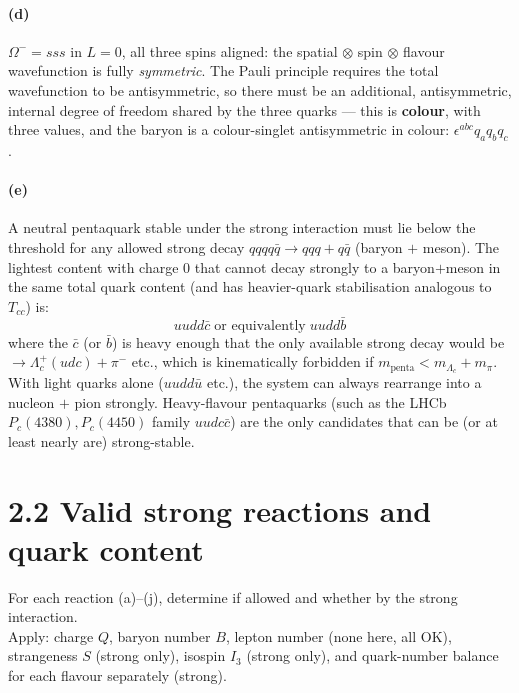 \documentclass[11pt]{article}
\newcommand{\Q}[1]{\begin{question}#1\end{question}}
\begin{document}
\paragraph{(d)} $\Omega^-=sss$ in $L=0$, all three spins aligned: the spatial $\otimes$ spin $\otimes$ flavour wavefunction is fully \emph{symmetric}. The Pauli principle requires the total wavefunction to be antisymmetric, so there must be an additional, antisymmetric, internal degree of freedom shared by the three quarks --- this is \textbf{colour}, with three values, and the baryon is a colour-singlet antisymmetric in colour: $\epsilon^{abc}q_a q_b q_c$.

\paragraph{(e)} A neutral pentaquark stable under the strong interaction must lie below the threshold for any allowed strong decay $qqqq\bar q\to qqq + q\bar q$ (baryon $+$ meson). The lightest content with charge $0$ that cannot decay strongly to a baryon$+$meson in the same total quark content (and has heavier-quark stabilisation analogous to $T_{cc}$) is:
\[
\boxed{\;uudd\bar c \;\text{or equivalently}\; uudd\bar b\;}
\]
where the $\bar c$ (or $\bar b$) is heavy enough that the only available strong decay would be $\to \Lambda_c^+(udc)+ \pi^-$ etc., which is kinematically forbidden if $m_\mathrm{penta}<m_{\Lambda_c}+m_\pi$. With light quarks alone ($uudd\bar u$ etc.), the system can always rearrange into a nucleon $+$ pion strongly. Heavy-flavour pentaquarks (such as the LHCb $P_c(4380),P_c(4450)$ family $uudc\bar c$) are the only candidates that can be (or at least nearly are) strong-stable.

\section*{2.2 \quad Valid strong reactions and quark content}

\Q{For each reaction (a)--(j), determine if allowed and whether by the strong interaction.\\
Apply: charge $Q$, baryon number $B$, lepton number (none here, all OK), strangeness $S$ (strong only), isospin $I_3$ (strong only), and quark-number balance for each flavour separately (strong).}
\end{document}
